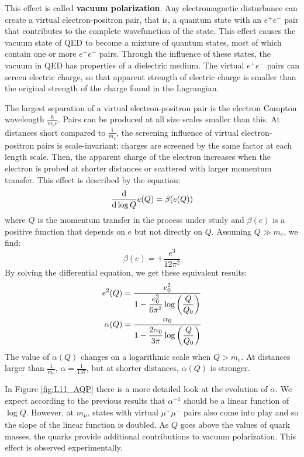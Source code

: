 \documentclass[../../main/main.tex]{subfiles}
\begin{document}
This effect is called \textbf{vacuum polarization}. Any electromagnetic disturbance can create a virtual electron-positron pair, that is, a quantum state with an \( e^+e^- \) pair that contributes to the complete wavefunction of the state. This effect causes the vacuum state of QED to become a mixture of quantum states, most of which contain one or more \( e^+e^- \) pairs. Through the influence of these states, the vacuum in QED has properties of a dielectric medium. The virtual \( e^+e^- \) pairs can screen electric charge, so that apparent strength of electric charge is smaller than the original strength of the charge found in the Lagrangian.

The largest separation of a virtual electron-positron pair is the electron Compton wavelength \( \frac{\hbar}{m_e c} \). Pairs can be produced at all size scales smaller than this. At distances short compared to \( \frac{1}{m_e} \), the screening influence of virtual electron-positron pairs is scale-invariant; charges are screened by the same factor at each length scale. Then, the apparent charge of the electron increases when the electron is probed at shorter distances or scattered with larger momentum transfer. This effect is described by the equation:
\begin{equation}
	\dv{}{\log Q} e(Q)
	=
	\beta(e(Q))
	\label{eq:L11_RGE}
\end{equation}
where \( Q \) is the momentum transfer in the process under study and \( \beta(e) \) is a positive function that depends on \( e \) but not directly on \( Q \). Assuming \( Q \gg m_e \), we find:
\begin{equation}
	\beta(e)
	=
	+ \frac{e^3}{12\pi^2}
	\label{eq:L11_RGEB}
\end{equation}
By solving the differential equation, we get these equivalent results:
\begin{align}
	e^2(Q) &= \frac{e^2_0}{\displaystyle 1 - \frac{e^2_0}{6\pi^2}\log\qty(\frac{Q}{Q_0}) }	\\
	\alpha(Q) &= \frac{\alpha_0}{\displaystyle 1 - \frac{2\alpha_0}{3\pi}\log\qty(\frac{Q}{Q_0}) }
\end{align}
The value of \( \alpha(Q) \) changes on a logarithmic scale when \( Q > m_e \). At distances larger than \( \frac{1}{m_e} \), \( \alpha = \frac{1}{137} \), but at shorter distances, \( \alpha(Q) \) is stronger.

In Figure \ref{fig:L11_AQP} there is a more detailed look at the evolution of \( \alpha \). We expect according to the previous results that \( \alpha^{-1} \) should be a linear function of \( \log Q \). However, at \( m_{\mu} \), states with virtual \( \mu^+\mu^- \) pairs also come into play and so the slope of the linear function is doubled. As \( Q \) goes above the values of quark masses, the quarks provide additional contributions to vacuum polarization. This effect is observed experimentally.
\end{document}
